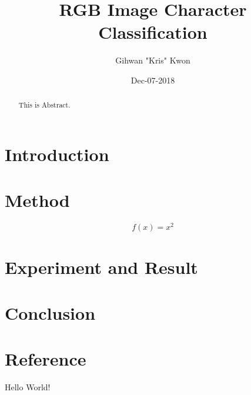\documentclass[12]{article}
\title{\textbf{RGB Image Character Classification}}
\date{Dec-07-2018}
\author{Gihwan "Kris" Kwon}
\begin{document}
    \maketitle
    \begin{abstract}
        This is Abstract.
        \vspace{1in}
    \end{abstract}

    \section{Introduction}
        
        \subsection{}
        \paragraph{}
        \subparagraph{}

    \section{Method}
        \begin{equation}
        f(x) = x^2
        \end{equation}
    \section{Experiment and Result}

    \section{Conclusion}

    \section{Reference}


    Hello World!
\end{document}

